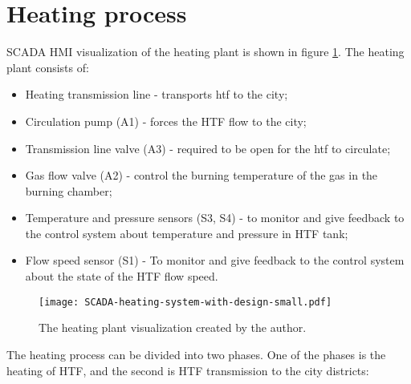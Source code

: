 \section{Heating process} \label{sec:heat-proces}


SCADA HMI visualization of the heating plant is shown in figure \ref{fig:scada-heating-view}. The heating plant consists of:

\begin{itemize}
	\item Heating transmission line - transports \gls*{htf} to the city;
	\item Circulation pump (A1) - forces the HTF flow to the city;
	\item Transmission line valve (A3) - required to be open for the \gls*{htf} to circulate;
	\item Gas flow valve (A2) - control the burning temperature of the gas in the burning chamber;
	\item Temperature and pressure sensors (S3, S4) - to monitor and give feedback to the control system about temperature and pressure in HTF tank;
	\item Flow speed sensor (S1) - To monitor and give feedback to the control system about the state of the HTF flow speed.
\end{itemize}

\begin{figure}[htb]
	\centering
	\texttt{[image: SCADA-heating-system-with-design-small.pdf]}
	\caption{The heating plant visualization created by the author.}
	\label{fig:scada-heating-view}
\end{figure}

The heating process can be divided into two phases. One of the phases is the heating of HTF, and the second is HTF transmission to the city districts:

